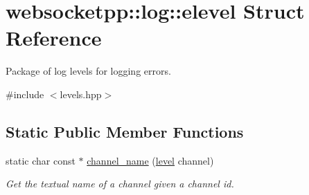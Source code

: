 \hypertarget{structwebsocketpp_1_1log_1_1elevel}{}\section{websocketpp\+:\+:log\+:\+:elevel Struct Reference}
\label{structwebsocketpp_1_1log_1_1elevel}


Package of log levels for logging errors.  




{\ttfamily \#include $<$levels.\+hpp$>$}

\subsection*{Static Public Member Functions}
\begin{DoxyCompactItemize}
\item 
static char const $\ast$ \hyperlink{structwebsocketpp_1_1log_1_1elevel_ac8eb65399a2ea6b782e0265a44618c0e}{channel\+\_\+name} (\hyperlink{namespacewebsocketpp_1_1log_a12d4d17939f102db8c9183d400a41960}{level} channel)
\begin{DoxyCompactList}\small\item\em Get the textual name of a channel given a channel id. \end{DoxyCompactList}\end{DoxyCompactItemize}
